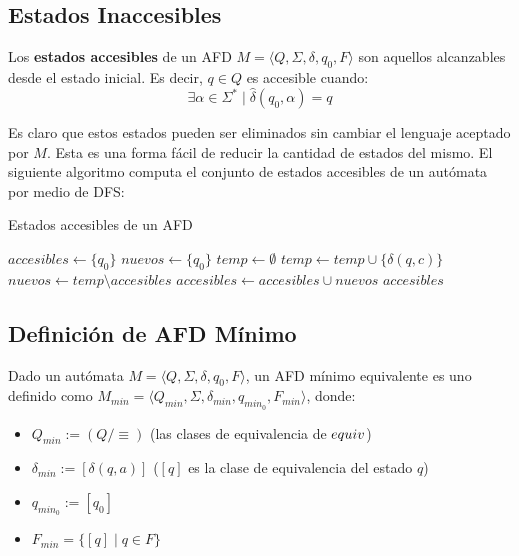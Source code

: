 \subsection{Estados Inaccesibles}

Los \textbf{estados accesibles} de un AFD $M = \langle Q, \Sigma, \delta, q_0, F \rangle$ son aquellos alcanzables desde el estado inicial. Es decir, $q \in Q$ es accesible cuando:
$$
    \exists \alpha \in \Sigma^* \mid \hat \delta(q_0, \alpha) = q
$$

Es claro que estos estados pueden ser eliminados sin cambiar el lenguaje aceptado por $M$. Esta es una forma fácil de reducir la cantidad de estados del mismo. El siguiente algoritmo computa el conjunto de estados accesibles de un autómata por medio de DFS:

\begin{algorithm}[H]
    \caption{Estados accesibles de un AFD}
    \label{accesibles}
    \begin{algorithmic}[1]
        \State $accesibles \gets \{q_0\}$
        \State $nuevos \gets \{q_0\}$
        \Repeat
        \State $temp \gets \emptyset$
        \State $temp \gets temp \cup \{\delta(q, c)\}$
        \EndFor
        \EndFor
        \State $nuevos \gets temp \setminus accesibles$
        \State $accesibles \gets accesibles \cup nuevos$
        \State \Return $accesibles$
        \EndProcedure
    \end{algorithmic}
\end{algorithm}

\subsection{Definición de AFD Mínimo}

Dado un autómata $M = \langle Q, \Sigma, \delta, q_0, F \rangle$, un AFD mínimo equivalente es uno definido como $M_{min} = \langle Q_{min}, \Sigma, \delta_{min}, q_{min_0}, F_{min} \rangle$, donde:

\begin{itemize}
    \item $Q_{min} := (Q / \mathop\equiv)$ (las clases de equivalencia de $\addcontentsline{file}{secunit}{entry}equiv$)
    \item $\delta_{min} := [\delta(q, a)]$ ($[q]$ es la clase de equivalencia del estado $q$)
    \item $q_{min_0} := [q_0]$
    \item $F_{min} = \{[q] \mid q \in F\}$
\end{itemize}

